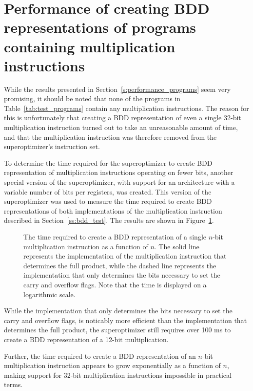 \documentclass[a4paper,11pt]{kth-mag}
\begin{document}
\section{Performance of creating BDD representations of programs containing multiplication instructions}
\label{s:performance_mul}

While the results presented in Section~\ref{s:performance_programs} seem very promising, it should be noted that none of the programs in Table~\ref{tab:test_programs} contain any multiplication instructions.
The reason for this is unfortunately that creating a BDD representation of even a single 32-bit multiplication instruction turned out to take an unreasonable amount of time,
and that the multiplication instruction was therefore removed from the superoptimizer's instruction set.

To determine the time required for the superoptimizer to create BDD representation of multiplication instructions operating on fewer bits,
another special version of the superoptimizer, with support for an architecture with a variable number of bits per registers, was created.
This version of the superoptimizer was used to measure the time required to create BDD representations of both implementations of the multiplication instruction described in Section~\ref{ss:bdd_test}.
The results are shown in Figure~\ref{fig:performance_mul}.

\begin{figure}
\centering

\caption{The time required to create a BDD representation of a single $n$-bit multiplication instruction as a function of $n$.
The solid line represents the implementation of the multiplication instruction that determines the full product,
while the dashed line represents the implementation that only determines the bits necessary to set the carry and overflow flags.
Note that the time is displayed on a logarithmic scale.}
\label{fig:performance_mul}
\end{figure}

While the implementation that only determines the bits necessary to set the carry and overflow flags, is noticably more efficient than the implementation that determines the full product,
the superoptimizer still requires over 100 ms to create a BDD representation of a 12-bit multiplication.

Further, the time required to create a BDD representation of an $n$-bit multiplication instruction appears to grow exponentially as a function of $n$,
making support for 32-bit multiplication instructions impossible in practical terms.
\end{document}
